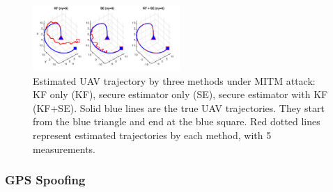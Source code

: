 \documentclass[../../thesis.tex]{subfiles}
\begin{document}
\begin{figure}
\center
\includegraphics[width=0.5\textwidth]{chapters/se_linear/figures/qh/uav_lq_traj}
\caption{Estimated UAV trajectory by three methods under MITM attack: KF only (KF), secure estimator only (SE), secure estimator with KF (KF+SE). Solid blue lines are the true UAV trajectories. They start from the blue triangle and end at the blue square. Red dotted lines represent estimated trajectories by each method, with 5 measurements.}
\label{fig:ex_uav_remote}
\end{figure}

\subsubsection{GPS Spoofing}
\end{document}
